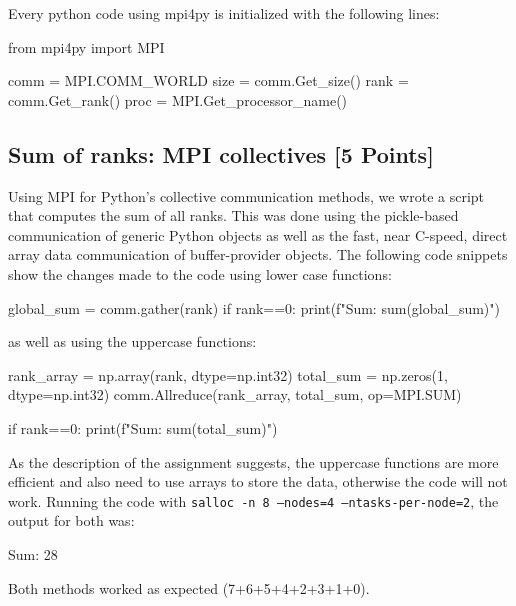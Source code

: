 \documentclass[unicode,11pt,a4paper,oneside,numbers=endperiod,openany]{scrartcl}
\begin{document}
Every python code using mpi4py is initialized with the following lines:
\begin{pythonverbatim}
from mpi4py import MPI

comm = MPI.COMM_WORLD
size = comm.Get_size()
rank = comm.Get_rank()
proc = MPI.Get_processor_name()
\end{pythonverbatim}
\subsection{Sum of ranks: MPI collectives [5 Points]}

Using MPI for Python's collective communication methods, we wrote a script that
computes the sum of all ranks. 
This was done using the pickle-based communication of generic Python objects as
well as the fast, near C-speed, direct array data communication of
buffer-provider objects.
The following code snippets show the changes made to the code using lower case functions:
\begin{pythonverbatim}
global_sum = comm.gather(rank)
if rank==0:
print(f"Sum: {sum(global_sum)}")
\end{pythonverbatim}
as well as using the uppercase functions:
\begin{pythonverbatim}
rank_array = np.array(rank, dtype=np.int32)
total_sum = np.zeros(1, dtype=np.int32)
comm.Allreduce(rank_array, total_sum, op=MPI.SUM)

if rank==0:
print(f"Sum: {sum(total_sum)}")
\end{pythonverbatim}
As the description of the assignment suggests, the uppercase functions are more
efficient and also need to use arrays to store the data, otherwise the code will not work.
Running the code with \texttt{salloc -n 8 --nodes=4 --ntasks-per-node=2}, the
output for both was:
\begin{grayverbatim}
Sum: 28
\end{grayverbatim}
Both methods worked as expected (7+6+5+4+2+3+1+0).
\end{document}
